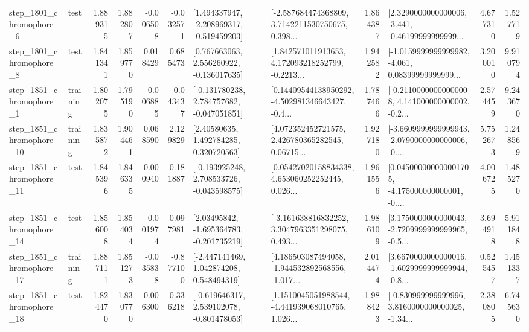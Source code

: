 \begin{tabular}{llrrrrllrlrr}
  step\_1801\_chromophore\_6 &      test &      1.889315 &    1.882807 &     -0.006508 & -0.032571 &   [1.494337947, -2.208969317, -0.519459203] &  [-2.587684474368809, 3.7142211530750675, 0.398... &       1.864387 &  [2.3290000000000006, -3.441, -0.46199999999999... &            4.677310 &          1.527719 \\
  step\_1801\_chromophore\_8 &      test &      1.841341 &    1.859770 &      0.018429 &  0.685473 &    [0.767663063, 2.556260922, -0.136017635] &  [1.842571011913653, 4.172093218252799, -0.2213... &       1.942582 &  [-1.0159999999999982, -4.061, 0.08399999999999... &            3.200010 &          9.910794 \\
  step\_1851\_chromophore\_1 &  training &      1.802075 &    1.795190 &     -0.006885 & -0.043437 &   [-0.131780238, 2.784757682, -0.047051851] &  [0.14409544138950292, -4.502981346643427, -0.4... &       1.787466 &  [-0.21100000000000008, 4.141000000000002, -0.2... &            2.574459 &          9.243670 \\
 step\_1851\_chromophore\_10 &  training &      1.835872 &    1.904461 &      0.068590 &  2.129829 &      [2.40580635, 1.492784285, 0.320720563] &  [4.072352452721575, 2.426780365282545, 0.06715... &       1.927180 &  [-3.6609999999999943, -2.0790000000000006, -0.... &            5.752673 &          1.248569 \\
 step\_1851\_chromophore\_11 &      test &      1.845396 &    1.846335 &      0.000940 &  0.181887 &   [-0.193925248, 2.708533726, -0.043598575] &  [0.05427020158834338, 4.653060252252445, 0.026... &       1.961556 &  [0.045000000000001705, -4.175000000000001, -0.... &            4.006725 &          1.485270 \\
 step\_1851\_chromophore\_14 &      test &      1.856008 &    1.854034 &     -0.001974 &  0.097981 &    [2.03495842, -1.695364783, -0.201735219] &  [-3.161638816832252, 3.3047963351298075, 0.493... &       1.986109 &  [3.1750000000000043, -2.7209999999999965, -0.5... &            3.694918 &          5.911848 \\
 step\_1851\_chromophore\_17 &  training &      1.887111 &    1.851273 &     -0.035838 & -0.877100 &    [-2.447141469, 1.042874208, 0.548494319] &  [4.186503087494058, -1.944532892568556, -1.017... &       2.014474 &  [3.6670000000000016, -1.6029999999999944, -0.8... &            0.525457 &          1.451337 \\
 step\_1851\_chromophore\_18 &      test &      1.824470 &    1.830770 &      0.006300 &  0.336218 &   [-0.619646317, 2.539102078, -0.801478053] &  [1.1510045051988544, -4.441939068010765, 1.026... &       1.988423 &  [-0.830999999999996, 3.8160000000000025, -1.34... &            2.380805 &          6.745630 \\

\end{tabular}
